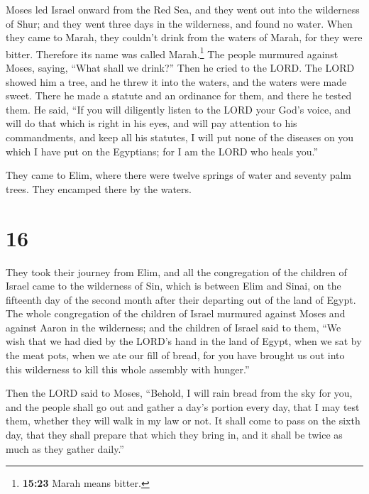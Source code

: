  Moses led Israel onward from the Red Sea, and they went
out into the wilderness of Shur; and they went three days in the
wilderness, and found no water.  When they came to Marah,
they couldn't drink from the waters of Marah, for they were bitter.
Therefore its name was called Marah.\footnote{\textbf{15:23} Marah means
  bitter.}  The people murmured against Moses, saying,
``What shall we drink?''  Then he cried to the LORD. The
LORD showed him a tree, and he threw it into the waters, and the waters
were made sweet. There he made a statute and an ordinance for them, and
there he tested them.  He said, ``If you will diligently
listen to the LORD your God's voice, and will do that which is right in
his eyes, and will pay attention to his commandments, and keep all his
statutes, I will put none of the diseases on you which I have put on the
Egyptians; for I am the LORD who heals you.''

 They came to Elim, where there were twelve springs of
water and seventy palm trees. They encamped there by the waters.

\hypertarget{section-15}{%
\section{16}\label{section-15}}

 They took their journey from Elim, and all the
congregation of the children of Israel came to the wilderness of Sin,
which is between Elim and Sinai, on the fifteenth day of the second
month after their departing out of the land of Egypt.  The
whole congregation of the children of Israel murmured against Moses and
against Aaron in the wilderness;  and the children of
Israel said to them, ``We wish that we had died by the LORD's hand in
the land of Egypt, when we sat by the meat pots, when we ate our fill of
bread, for you have brought us out into this wilderness to kill this
whole assembly with hunger.''

 Then the LORD said to Moses, ``Behold, I will rain bread
from the sky for you, and the people shall go out and gather a day's
portion every day, that I may test them, whether they will walk in my
law or not.  It shall come to pass on the sixth day, that
they shall prepare that which they bring in, and it shall be twice as
much as they gather daily.''

